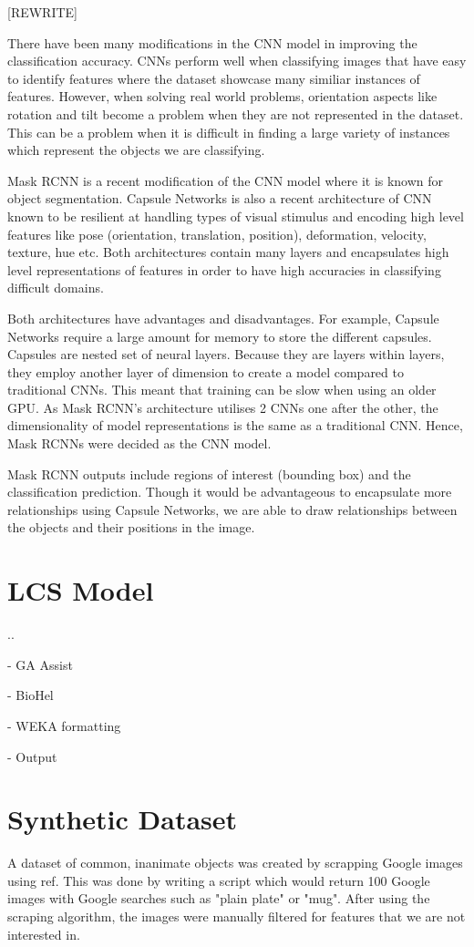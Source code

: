 [REWRITE]

There have been many modifications in the CNN model in improving the classification accuracy. CNNs perform well when classifying images that have easy to identify features where the dataset showcase many similiar instances of features. However, when solving real world problems, orientation aspects like rotation and tilt become a problem when they are not represented in the dataset. This can be a problem when it is difficult in finding a large variety of instances which represent the objects we are classifying.


Mask RCNN is a recent modification of the CNN model where it is known for object segmentation. 
Capsule Networks is also a recent architecture of CNN known to be resilient at handling types of visual stimulus and encoding high level features like pose (orientation, translation, position), deformation, velocity, texture, hue etc. Both architectures contain many layers and encapsulates high level representations of features in order to have high accuracies in classifying difficult domains.

Both architectures have advantages and disadvantages. For example, Capsule Networks require a large amount for memory to store the different capsules. Capsules are nested set of neural layers. Because they are layers within layers, they employ another layer of dimension to create a model compared to traditional CNNs. This meant that training can be slow when using an older GPU. As Mask RCNN's architecture utilises 2 CNNs one after the other, the dimensionality of model representations is the same as a traditional CNN. Hence, Mask RCNNs were decided as the CNN model. 

Mask RCNN outputs include regions of interest (bounding box) and the classification prediction. Though it would be advantageous to encapsulate more relationships using Capsule Networks, we are able to draw relationships between the objects and their positions in the image.

\section{LCS Model}

..


- GA Assist

- BioHel

- WEKA formatting 

- Output
\section{Synthetic Dataset}
A dataset of common, inanimate objects was created by scrapping Google images using ref. This was done by writing a script which would return 100 Google images with Google searches such as "plain plate" or "mug". After using the scraping algorithm, the images were manually filtered for features that we are not interested in. 

